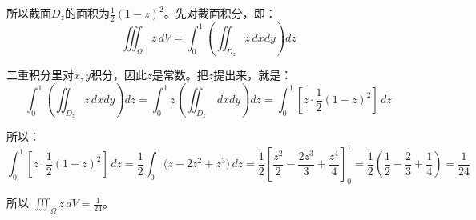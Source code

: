 \begin{myexample}
所以截面\(D_z\)的面积为\(\frac12 (1-z)^2\)。先对截面积分，即：
\[
\iiint_{\Omega} z\,dV
= \int_{0}^{1} \left( \iint_{D_z} z\,dxdy \right) dz
\]

二重积分里对\(x,y\)积分，因此\(z\)是常数。把\(z\)提出来，就是：
\[
\int_{0}^{1} \left( \iint_{D_z} z\,dxdy \right) dz=\int_{0}^{1} z \left( \iint_{D_z} \,dxdy \right) dz=\int_{0}^{1} [z\cdot\frac12 (1-z)^2] \,dz
\]

所以：
\[
\int_{0}^{1} [z\cdot\frac12 (1-z)^2] \,dz
= \frac12 \int_{0}^{1} \bigl( z - 2z^2 + z^3 \bigr) \, dz
= \frac12 \left[ \frac{z^2}{2} - \frac{2z^3}{3} + \frac{z^4}{4} \right]_{0}^{1}
= \frac12 (\frac12 - \frac23 + \frac14)
= \frac{1}{24}
\]

所以 \(\iiint_{\Omega} z\,dV = \frac{1}{24}\)。
\end{myexample}

